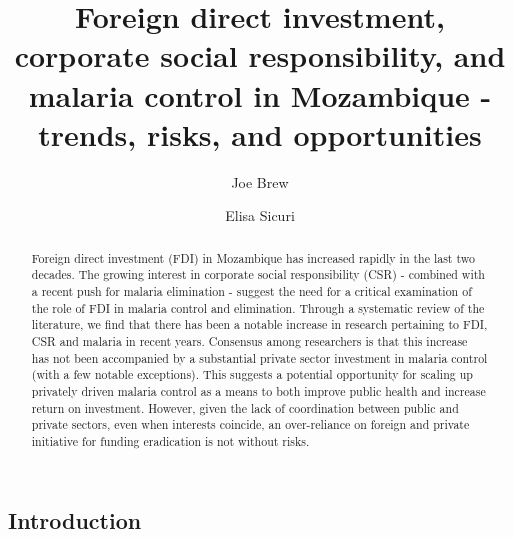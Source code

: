 \documentclass[]{elsarticle} %
\begin{document}
\begin{frontmatter}

  \title{Foreign direct investment, corporate social responsibility, and malaria
control in Mozambique - trends, risks, and opportunities}
    \author[isglobal,cism,vu]{Joe Brew}
    \author[isglobal,icl,cism]{Elisa Sicuri}
  
      \address[isglobal]{Barcelona Institute for Global Health, c/ Rosselló, 132, 5è 2a. 08036,
Barcelona, Spain}
    \address[icl]{Imperial College London, South Kensington Campus, London SW7 2AZ, U.K.}
    \address[cism]{Centro de Investigação em Saúde de Manhiça, Vila da Manhiça, Bairro
Cambeve, Rua 12, Distrito da Manhiça, CP 1929, Maputo, Mozambique}
    \address[vu]{VU University Amsterdam, De Boelelaan 1105, 1081 HV Amsterdam,
Netherlands}
  
  \begin{abstract}
  Foreign direct investment (FDI) in Mozambique has increased rapidly in
  the last two decades. The growing interest in corporate social
  responsibility (CSR) - combined with a recent push for malaria
  elimination - suggest the need for a critical examination of the role of
  FDI in malaria control and elimination. Through a systematic review of
  the literature, we find that there has been a notable increase in
  research pertaining to FDI, CSR and malaria in recent years. Consensus
  among researchers is that this increase has not been accompanied by a
  substantial private sector investment in malaria control (with a few
  notable exceptions). This suggests a potential opportunity for scaling
  up privately driven malaria control as a means to both improve public
  health and increase return on investment. However, given the lack of
  coordination between public and private sectors, even when interests
  coincide, an over-reliance on foreign and private initiative for funding
  eradication is not without risks.
  \end{abstract}
  
 \end{frontmatter}

\subsection{Introduction}\label{introduction}
\end{document}
